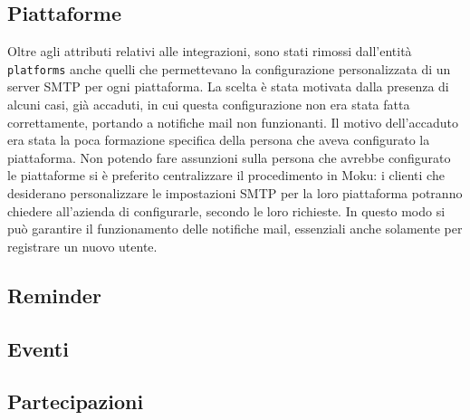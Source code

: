 \subsection{Piattaforme}
Oltre agli attributi relativi alle integrazioni, sono stati rimossi dall'entità \verb|platforms| anche quelli che permettevano la configurazione personalizzata di un server SMTP per ogni piattaforma. La scelta è stata motivata dalla presenza di alcuni casi, già accaduti, in cui questa configurazione non era stata fatta correttamente, portando a notifiche mail non funzionanti. Il motivo dell'accaduto era stata la poca formazione specifica della persona che aveva configurato la piattaforma. Non potendo fare assunzioni sulla persona che avrebbe configurato le piattaforme si è preferito centralizzare il procedimento in Moku: i clienti che desiderano personalizzare le impostazioni SMTP per la loro piattaforma potranno chiedere all'azienda di configurarle, secondo le loro richieste. In questo modo si può garantire il funzionamento delle notifiche mail, essenziali anche solamente per registrare un nuovo utente.


\subsection{Reminder}

\subsection{Eventi}

\subsection{Partecipazioni}
